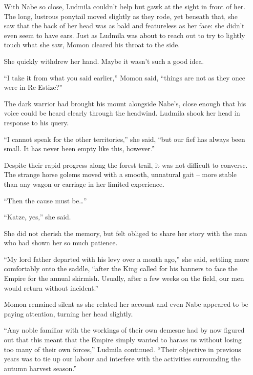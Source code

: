 With Nabe so close, Ludmila couldn't help but gawk at the sight in front of her. The long, lustrous ponytail moved slightly as they rode, yet beneath that, she saw that the back of her head was as bald and featureless as her face: she didn’t even seem to have ears. Just as Ludmila was about to reach out to try to lightly touch what she saw, Momon cleared his throat to the side.

 

She quickly withdrew her hand. Maybe it wasn’t such a good idea.

 

“I take it from what you said earlier,” Momon said, “things are not as they once were in Re-Estize?”

 

The dark warrior had brought his mount alongside Nabe's, close enough that his voice could be heard clearly through the headwind. Ludmila shook her head in response to his query.

 

“I cannot speak for the other territories,” she said, “but our fief has always been small. It has never been empty like this, however.”

 

Despite their rapid progress along the forest trail, it was not difficult to converse. The strange horse golems moved with a smooth, unnatural gait – more stable than any wagon or carriage in her limited experience.

 

“Then the cause must be…”

 

“Katze, yes,” she said.

 

She did not cherish the memory, but felt obliged to share her story with the man who had shown her so much patience.

 

“My lord father departed with his levy over a month ago,” she said, settling more comfortably onto the saddle, “after the King called for his banners to face the Empire for the annual skirmish. Usually, after a few weeks on the field, our men would return without incident.”

 

Momon remained silent as she related her account and even Nabe appeared to be paying attention, turning her head slightly.

 

“Any noble familiar with the workings of their own demesne had by now figured out that this meant that the Empire simply wanted to harass us without losing too many of their own forces,” Ludmila continued. “Their objective in previous years was to tie up our labour and interfere with the activities surrounding the autumn harvest season.”

